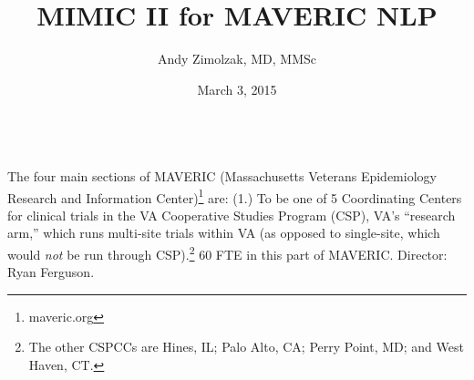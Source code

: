 \documentclass{tufte-handout}
\title{MIMIC II for MAVERIC NLP}
\author{Andy Zimolzak, MD, MMSc}
\date{March 3, 2015}
\begin{document}
\maketitle

~\\

The four main sections of MAVERIC (Massachusetts Veterans Epidemiology
Research and Information Center)\footnote{maveric.org} are: (1.) To be
one of 5 Coordinating Centers for clinical trials in the VA
Cooperative Studies Program (CSP), VA's ``research arm,'' which runs
multi-site trials within VA (as opposed to single-site, which would
\emph{not} be run through CSP).\footnote{The other CSPCCs are Hines,
  IL; Palo Alto, CA; Perry Point, MD; and West Haven, CT.} 60 FTE in
this part of MAVERIC. Director: Ryan Ferguson.
\end{document}
